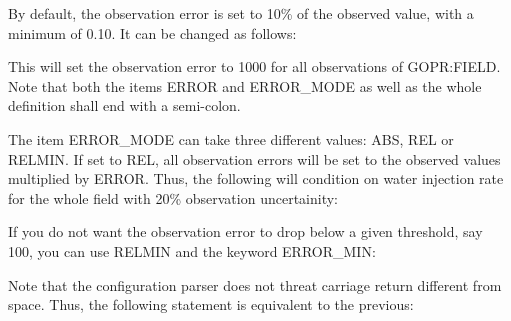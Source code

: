 \documentclass[a4paper,10pt,english]{sphinxmanual}
\begin{document}
By default, the observation error is set to 10\% of the observed value,
with a minimum of 0.10. It can be changed as follows:

%
\begin{sphinxVerbatim}[commandchars=\\\{\}]
 
           
      
\end{sphinxVerbatim}

This will set the observation error to 1000 for all observations of
GOPR:FIELD. Note that both the items ERROR and ERROR\_MODE as well as
the whole definition shall end with a semi-colon.

The item ERROR\_MODE can take three different values: ABS, REL or
RELMIN. If set to REL, all observation errors will be set to the
observed values multiplied by ERROR. Thus, the following will
condition on water injection rate for the whole field with 20\%
observation uncertainity:

%
\begin{sphinxVerbatim}[commandchars=\\\{\}]
 
           
      
\end{sphinxVerbatim}

If you do not want the observation error to drop below a given
threshold, say 100, you can use RELMIN and the keyword ERROR\_MIN:

%
\begin{sphinxVerbatim}[commandchars=\\\{\}]
 
           
      
       
\end{sphinxVerbatim}

Note that the configuration parser does not threat carriage return
different from space. Thus, the following statement is equivalent to
the previous:
\end{document}
